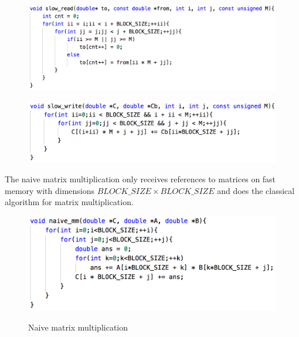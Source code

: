 \documentclass[unicode,11pt,a4paper,oneside,numbers=endperiod,openany]{scrartcl}
\begin{document}
\begin{enumerate}
            \begin{figure}[H]
                \begin{minipage}{.48\textwidth}
                    \centering
                    \includegraphics[width=\linewidth]{load}
                    \label{load}
                \end{minipage}%
                \hfill
                \begin{minipage}{.48\textwidth}
                    \centering
                    \includegraphics[width=\linewidth]{write}
                    \label{write}
                \end{minipage}
            \end{figure}

        The naive matrix multiplication only receives references to matrices on fast memory with dimensions $BLOCK\_SIZE \times BLOCK\_SIZE$ and does the classical algorithm for matrix multiplication.

            \begin{figure}[H]
                \includegraphics[width=\linewidth]{naive}
                \label{naive}
                \caption{Naive matrix multiplication}
            \end{figure}


\end{enumerate}
\end{document}
